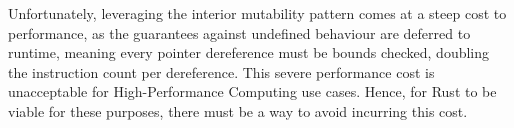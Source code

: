 


Unfortunately, leveraging the interior mutability pattern comes at a steep cost to performance, as the guarantees against undefined behaviour are deferred to runtime, meaning every pointer dereference must be bounds checked, doubling the instruction count per dereference.
This severe performance cost is unacceptable for High-Performance Computing use cases. Hence, for Rust to be viable for these purposes, there must be a way to avoid incurring this cost.

